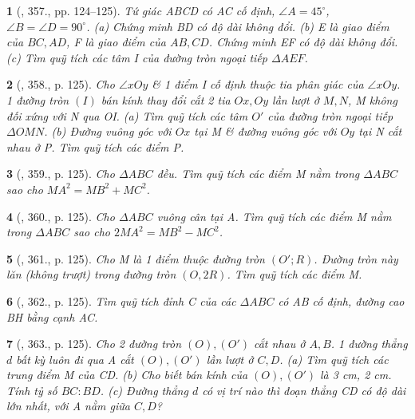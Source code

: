 \documentclass{article}
\newtheorem{baitoan}{}
\begin{document}
\begin{baitoan}[\cite{Binh_Toan_9_tap_2}, 357., pp. 124--125]
	Tứ giác ABCD có AC cố định, $\angle{A} = 45^\circ$, $\angle{B} = \angle{D} = 90^\circ$. (a) Chứng minh BD có độ dài không đổi. (b) E là giao điểm của $BC,AD$, F là giao điểm của $AB,CD$. Chứng minh EF có độ dài không đổi. (c) Tìm quỹ tích các tâm I của đường tròn ngoại tiếp $\Delta AEF$.
\end{baitoan}

\begin{baitoan}[\cite{Binh_Toan_9_tap_2}, 358., p. 125]
	Cho $\angle{xOy}$ \& 1 điểm I cố định thuộc tia phân giác của $\angle{xOy}$. 1 đường tròn $(I)$ bán kính thay đổi cắt 2 tia $Ox,Oy$ lần lượt ở $M,N$, M không đối xứng với N qua OI. (a) Tìm quỹ tích các tâm $O'$ của đường tròn ngoại tiếp $\Delta OMN$. (b) Đường vuông góc với $Ox$ tại M \& đường vuông góc với $Oy$ tại N cắt nhau ở P. Tìm quỹ tích các điểm P.
\end{baitoan}

\begin{baitoan}[\cite{Binh_Toan_9_tap_2}, 359., p. 125]
	Cho $\Delta ABC$ đều. Tìm quỹ tích các điểm M nằm trong $\Delta ABC$ sao cho $MA^2 = MB^2 + MC^2$.
\end{baitoan}

\begin{baitoan}[\cite{Binh_Toan_9_tap_2}, 360., p. 125]
	Cho $\Delta ABC$ vuông cân tại A. Tìm quỹ tích các điểm M nằm trong $\Delta ABC$ sao cho $2MA^2 = MB^2 - MC^2$.
\end{baitoan}

\begin{baitoan}[\cite{Binh_Toan_9_tap_2}, 361., p. 125]
	Cho M là 1 điểm thuộc đường tròn $(O';R)$. Đường tròn này lăn (không trượt) trong đường tròn $(O,2R)$. Tìm quỹ tích các điểm M.
\end{baitoan}

\begin{baitoan}[\cite{Binh_Toan_9_tap_2}, 362., p. 125]
	Tìm quỹ tích đỉnh C của các $\Delta ABC$ có AB cố định, đường cao BH bằng cạnh AC.
\end{baitoan}

\begin{baitoan}[\cite{Binh_Toan_9_tap_2}, 363., p. 125]
	Cho 2 đường tròn $(O),(O')$ cắt nhau ở $A,B$. 1 đường thẳng $d$ bất kỳ luôn đi qua A cắt $(O),(O')$ lần lượt ở $C,D$. (a) Tìm quỹ tích các trung điểm M của CD. (b) Cho biết bán kính của $(O),(O')$ là {\rm3 cm, 2 cm}. Tính tỷ số $BC:BD$. (c) Đường thẳng $d$ có vị trí nào thì đoạn thẳng CD có độ dài lớn nhất, với A nằm giữa $C,D$?
\end{baitoan}
\end{document}
